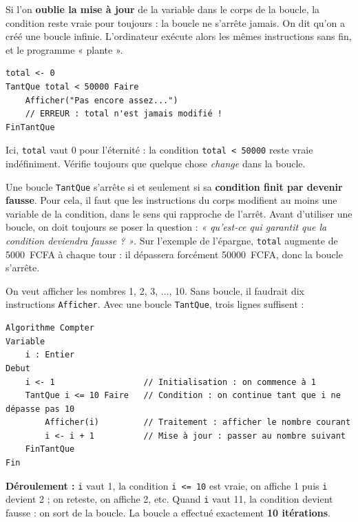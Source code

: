 \documentclass[11pt]{article}
\newcommand{\cle}[1]{{\popxbold\color{popdark}#1}}
\newcounter{popsec}
\newcounter{popsub}
\newcommand{\courssub}[1]{%
  \stepcounter{popsub}%
  \par\vspace{9pt}\noindent{\popxbold\fontsize{11.5}{13}\selectfont\color{popink}{\color{poporange}\thepopsec.\thepopsub}\hspace{6pt}#1}\par\nopagebreak\vspace{4pt}
}
\begin{document}
\begin{attention}
Si l'on \textbf{oublie la mise à jour} de la variable dans le corps de la boucle, la condition reste vraie pour toujours : la boucle ne s'arrête jamais. On dit qu'on a créé une \cle{boucle infinie}. L'ordinateur exécute alors les mêmes instructions sans fin, et le programme « plante ».
\begin{lstlisting}
total <- 0
TantQue total < 50000 Faire
    Afficher("Pas encore assez...")
    // ERREUR : total n'est jamais modifié !
FinTantQue
\end{lstlisting}
Ici, \texttt{total} vaut 0 pour l'éternité : la condition \texttt{total < 50000} reste vraie indéfiniment. Vérifie toujours que quelque chose \emph{change} dans la boucle.
\end{attention}

\begin{propriete}
Une boucle \texttt{TantQue} s'arrête si et seulement si sa \textbf{condition finit par devenir fausse}. Pour cela, il faut que les instructions du corps modifient au moins une variable de la condition, dans le sens qui rapproche de l'arrêt. Avant d'utiliser une boucle, on doit toujours se poser la question : \emph{« qu'est-ce qui garantit que la condition deviendra fausse ? »}. Sur l'exemple de l'épargne, \texttt{total} augmente de \SI{5000}{FCFA} à chaque tour : il dépassera forcément \SI{50000}{FCFA}, donc la boucle s'arrête.
\end{propriete}

\courssub{Exemple 1 : compter de 1 à 10}

\begin{exemplebox}
On veut afficher les nombres 1, 2, 3, ..., 10. Sans boucle, il faudrait dix instructions \texttt{Afficher}. Avec une boucle \texttt{TantQue}, trois lignes suffisent :
\begin{lstlisting}
Algorithme Compter
Variable
    i : Entier
Debut
    i <- 1                  // Initialisation : on commence à 1
    TantQue i <= 10 Faire   // Condition : on continue tant que i ne dépasse pas 10
        Afficher(i)         // Traitement : afficher le nombre courant
        i <- i + 1          // Mise à jour : passer au nombre suivant
    FinTantQue
Fin
\end{lstlisting}
\textbf{Déroulement :} \texttt{i} vaut 1, la condition \texttt{i <= 10} est vraie, on affiche 1 puis \texttt{i} devient 2 ; on reteste, on affiche 2, etc. Quand \texttt{i} vaut 11, la condition devient fausse : on sort de la boucle. La boucle a effectué exactement \textbf{10 itérations}.
\end{exemplebox}
\end{document}
